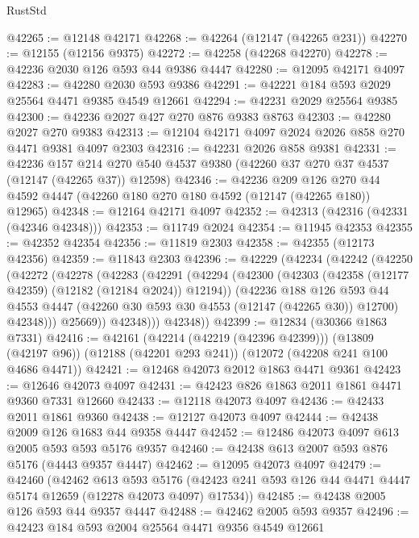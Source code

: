\begin{lexlean}{RustStd}
\begin{coremodule}
@42265 := @12148 @42171
@42268 := @42264 (@12147 (@42265 @231))
@42270 := @12155 (@12156 @9375)
@42272 := @42258 (@42268 @42270)
@42278 := @42236 @2030 @126 @593 @44 @9386 @4447
@42280 := @12095 @42171 @4097
@42283 := @42280 @2030 @593 @9386
@42291 := @42221 @184 @593 @2029 @25564 @4471 @9385 @4549 @12661
@42294 := @42231 @2029 @25564 @9385
@42300 := @42236 @2027 @427 @270 @876 @9383 @8763
@42303 := @42280 @2027 @270 @9383
@42313 := @12104 @42171 @4097 @2024 @2026 @858 @270 @4471 @9381 @4097 @2303
@42316 := @42231 @2026 @858 @9381
@42331 := @42236
    @157
    @214
    @270
    @540
    @4537
    @9380
    (@42260 @37 @270 @37 @4537 (@12147 (@42265 @37)) @12598)
@42346 := @42236
    @209
    @126
    @270
    @44
    @4592
    @4447
    (@42260 @180 @270 @180 @4592 (@12147 (@42265 @180)) @12965)
@42348 := @12164 @42171 @4097
@42352 := @42313 (@42316 (@42331 (@42346 @42348)))
@42353 := @11749 @2024
@42354 := @11945 @42353
@42355 := @42352 @42354
@42356 := @11819 @2303
@42358 := @42355 (@12173 @42356)
@42359 := @11843 @2303
@42396 := @42229
    (@42234
      (@42242
        (@42250
          (@42272
            (@42278
              (@42283
                (@42291
                  (@42294
                    (@42300
                      (@42303 (@42358 (@12177 @42359) (@12182 (@12184 @2024)) @12194))
                      (@42236
                        @188
                        @126
                        @593
                        @44
                        @4553
                        @4447
                        (@42260 @30 @593 @30 @4553 (@12147 (@42265 @30)) @12700)
                        @42348)))
                  @25669))
              @42348)))
        @42348))
@42399 := @12834 (@30366 @1863 @7331)
@42416 := @42161
    (@42214 (@42219 (@42396 @42399)))
    (@13809 (@42197 @96))
    (@12188 (@42201 @293 @241))
    (@12072 (@42208 @241 @100 @4686 @4471))
@42421 := @12468 @42073 @2012 @1863 @4471 @9361
@42423 := @12646 @42073 @4097
@42431 := @42423 @826 @1863 @2011 @1861 @4471 @9360 @7331 @12660
@42433 := @12118 @42073 @4097
@42436 := @42433 @2011 @1861 @9360
@42438 := @12127 @42073 @4097
@42444 := @42438 @2009 @126 @1683 @44 @9358 @4447
@42452 := @12486 @42073 @4097 @613 @2005 @593 @593 @5176 @9357
@42460 := @42438 @613 @2007 @593 @876 @5176 (@4443 @9357 @4447)
@42462 := @12095 @42073 @4097
@42479 := @42460
    (@42462
      @613
      @593
      @5176
      (@42423 @241 @593 @126 @44 @4471 @4447 @5174 @12659 (@12278 @42073 @4097) @17534))
@42485 := @42438 @2005 @126 @593 @44 @9357 @4447
@42488 := @42462 @2005 @593 @9357
@42496 := @42423 @184 @593 @2004 @25564 @4471 @9356 @4549 @12661

\end{coremodule}
\end{lexlean}
